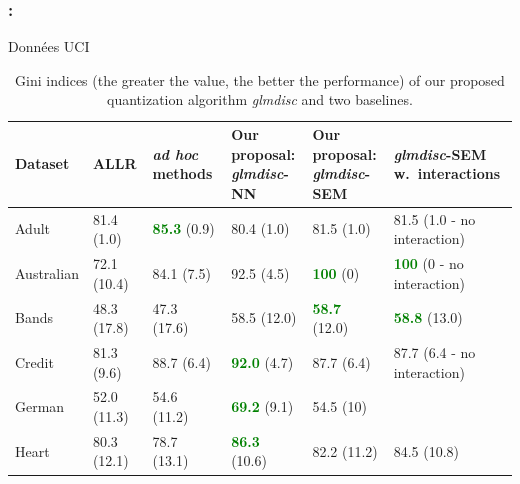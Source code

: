 \documentclass[english,xcolor={rgb,dvipsnames,table,usenames}]{beamer}
\begin{document}
\begin{frame}
\frametitle{\secname: \subsecname}

Données UCI

\begin{table}
    \centering
        \caption{Gini indices (the greater the value, the better the performance) of our proposed quantization algorithm \textit{glmdisc} and two baselines.}
    \label{tab:banchmark_inter}
\begin{tiny}
\begin{tabular}{llllll}
Dataset & ALLR & \textit{ad hoc} methods & \makecell{Our proposal:\\ \textit{glmdisc}-NN} & \makecell{Our proposal:\\ \textit{glmdisc}-SEM} & \makecell{\textit{glmdisc}-SEM\\ w.\ interactions} \\
\hline
Adult & 81.4 (1.0) & \textcolor{green}{\textbf{85.3}} (0.9) & 80.4 (1.0) & 81.5 (1.0) & 81.5 (1.0 - no interaction) \\
Australian & 72.1 (10.4) & 84.1 (7.5) & 92.5 (4.5) & \textcolor{green}{\textbf{100}} (0) & \textcolor{green}{\textbf{100}} (0 - no interaction) \\
Bands & 48.3 (17.8) & 47.3 (17.6) & 58.5 (12.0) & \textcolor{green}{\textbf{58.7}} (12.0) & \textcolor{green}{\textbf{58.8}} (13.0) \\
Credit & 81.3 (9.6) & 88.7 (6.4) & \textcolor{green}{\textbf{92.0}} (4.7) & 87.7 (6.4) & 87.7 (6.4 - no interaction) \\
German & 52.0 (11.3) & 54.6 (11.2) & \textcolor{green}{\textbf{69.2}} (9.1) & 54.5 (10) &  \\
Heart & 80.3 (12.1) & 78.7 (13.1) & \textcolor{green}{\textbf{86.3}} (10.6) & 82.2 (11.2) & 84.5 (10.8)
\end{tabular}
\end{tiny}
\end{table}

\end{frame}
\end{document}
